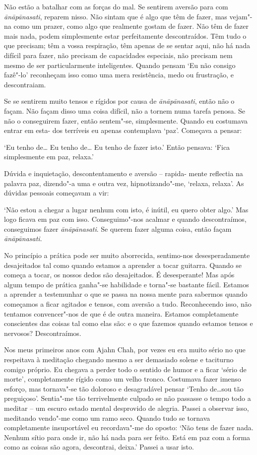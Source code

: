 Não estão a batalhar com as forças do mal. Se sentirem aversão para com
\emph{ānāpānasati}, reparem nisso. Não sintam que é algo que têm de
fazer, mas vejam"-na como um prazer, como algo que realmente gostam de
fazer. Não têm de fazer mais nada, podem simplesmente estar
perfeitamente descontraídos. Têm tudo o que precisam; têm a vossa
respiração, têm apenas de se sentar aqui, não há nada difícil para
fazer, não precisam de capacidades especiais, não precisam nem mesmo de
ser particularmente inteligentes. Quando pensam `Eu não consigo fazê"-lo'
reconheçam isso como uma mera resistência, medo ou frustração, e
descontraiam.

Se se sentirem muito tensos e rígidos por causa de \emph{ānāpānasati},
então não o façam. Não façam disso uma coisa difícil, não a tornem numa
tarefa penosa. Se não o conseguirem fazer, então sentem"-se,
simplesmente. Quando eu costumava entrar em esta- dos terríveis eu
apenas contemplava `paz'. Começava a pensar:

`Eu tenho de\ldots{} Eu tenho de\ldots{} Eu tenho de fazer isto.' Então
pensava: `Fica simplesmente em paz, relaxa.'

Dúvida e inquietação, descontentamento e aversão -- rapida- mente
reflectia na palavra paz, dizendo"-a uma e outra vez, hipnotizando"-me,
`relaxa, relaxa'. As dúvidas pessoais começavam a vir:

`Não estou a chegar a lugar nenhum com isto, é inútil, eu quero
obter algo.' Mas logo ficava em paz com isso. Conseguimo"-nos acalmar e
quando descontraímos, conseguimos fazer \emph{ānāpānasati}. Se querem
fazer alguma coisa, então façam \emph{ānāpānasati}.

No princípio a prática pode ser muito aborrecida, sentimo-nos
desesperadamente desajeitados tal como quando estamos a aprender a tocar
guitarra. Quando se começa a tocar, os nossos dedos são desajeitados. É
desesperante! Mas após algum tempo de prática ganha"-se habilidade e
torna"-se bastante fácil. Estamos a aprender a testemunhar o que se passa
na nossa mente para sabermos quando começamos a ficar agitados e tensos,
com aversão a tudo. Reconhecendo isso, não tentamos convencer"-nos de que
é de outra maneira. Estamos completamente conscientes das coisas tal
como elas são: e o que fazemos quando estamos tensos e nervosos?
Descontraímos.

Nos meus primeiros anos com Ajahn Chah, por vezes eu era muito sério no
que respeitava à meditação chegando mesmo a ser demasiado solene e
taciturno comigo próprio. Eu chegava a perder todo o sentido de humor e
a ficar `sério de morte', completamente rígido como um velho tronco.
Costumava fazer imenso esforço, mas tornava"-se tão doloroso e
desagradável pensar `Tenho de\ldots{}sou tão preguiçoso'. Sentia"-me tão
terrivelmente culpado se não passasse o tempo todo a meditar -- um
escuro estado mental desprovido de alegria. Passei a observar isso,
meditando vendo"-me como um ramo seco. Quando tudo se tornava
completamente insuportável eu recordava"-me do oposto: `Não tens de fazer
nada. Nenhum sítio para onde ir, não há nada para ser feito. Está em paz
com a forma como as coisas são agora, descontrai, deixa.' Passei a usar
isto.

